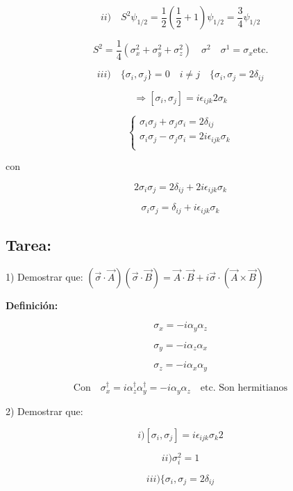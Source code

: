 \documentclass{report}
\begin{document}
\[ii) \quad S^2 \psi_{1/2} = \frac{1}{2}(\frac{1}{2} + 1) \psi_{1/2} = \frac{3}{4} \psi _{1/2}\]

\[S^{2} = \frac{1}{4} (\sigma_{x}^{2} +\sigma_{y}^{2} +\sigma_{z}^{2} ) \quad \sigma^2 \quad \sigma^{1} = \sigma_{x} \text{etc.}\]

\[iii) \quad \lbrace \sigma_{i},\sigma_{j} \rbrace = 0 \quad i \neq j \quad \lbrace \sigma_{i} , \sigma_{j} = 2 \delta _{i j}\]

\[\Rightarrow [\sigma_{i},\sigma_{j}] = i \epsilon_{ijk} 2 \sigma_{k}\]

\[
  \begin{cases}
    \sigma _{i} \sigma_{j} + \sigma_{j} \sigma_{i} = 2 \delta_{ij}\\
    \sigma _{i} \sigma_{j} - \sigma_{j} \sigma_{i} = 2 i \epsilon_{ijk} \sigma_{k}\\
  \end{cases}\]

con

\[2 \sigma _{i} \sigma_{j} = 2 \delta_{ij} + 2 i \epsilon_{ijk} \sigma_{k}\]

\[\sigma _{i} \sigma_{j} = \delta_{ij} + i \epsilon _{ijk} \sigma_{k} \]

\subsection{Tarea:}

1) Demostrar que: $(\overrightarrow{\sigma} \cdot \overrightarrow{A})(\overrightarrow{\sigma} \cdot \overrightarrow{B}) = \overrightarrow{A} \cdot \overrightarrow{B} + i \overrightarrow{\sigma} \cdot (\overrightarrow{A} \times \overrightarrow{B})$

\textbf{Definición:}

\[\sigma_{x} = - i \alpha_{y} \alpha_{z}\]

\[\sigma_{y} = - i \alpha_{z} \alpha_{x}\]

\[\sigma_{z} = - i \alpha_{x} \alpha_{y}\]


\[\text{Con} \quad \sigma_{x}^{\dagger} = i \alpha_{z}^{\dagger} \alpha_{y}^{\dagger} = - i \alpha_{y} \alpha_{z} \quad \text{etc. Son hermitianos}\]

2) Demostrar que:

\[i)[\sigma _{i} , \sigma _{j}] = i \epsilon _{ijk} \sigma _{k} 2 \]

\[ii)\sigma _{i}^{2} = 1\]

\[iii)\lbrace \sigma _{i} , \sigma _{j} = 2 \delta _{ij}\]   
\end{document}
